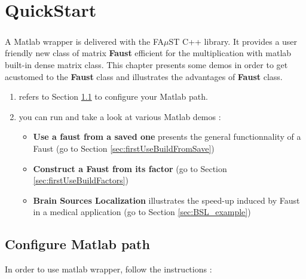 \chapter{QuickStart}\label{sec:firstUse}


\paragraph{}A Matlab wrapper is delivered with the FA$\mu$ST C++ library.
It provides a user friendly new class of matrix \textbf{Faust} efficient for the multiplication with matlab built-in dense matrix class.\newline
This chapter presents some demos in order to get acustomed to the \textbf{Faust} class and illustrates the advantages of \textbf{Faust} class.  
\begin{enumerate}  
	\item refers to Section \ref{sec:firstUseMatlabPath} to configure your Matlab path.
	\item you can run and take a look at various Matlab demos :
	\begin{itemize}
		\item \textbf{Use a faust from a saved one} presents the general functionnality of a Faust (go to Section \ref{sec:firstUseBuildFromSave})
		\item \textbf{Construct a Faust from its factor}  (go to  Section \ref{sec:firstUseBuildFactors})
		\item \textbf{Brain Sources Localization}  illustrates the speed-up induced by Faust in a medical application (go to  Section \ref{sec:BSL_example})	
	\end{itemize}
\end{enumerate} 





\section{Configure Matlab path}\label{sec:firstUseMatlabPath}
In order to use matlab wrapper, follow the instructions :

